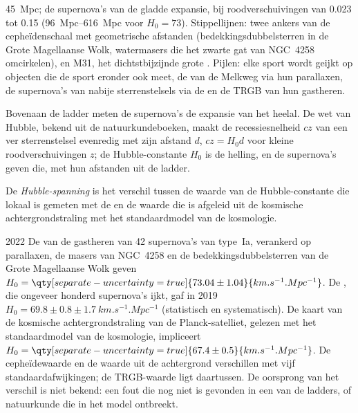 \begin{omfigure}
{\qty{45}{Mpc}; de supernova's van de gladde expansie, bij roodverschuivingen van 0.023
tot 0.15 (\qtyrange{96}{616}{Mpc} voor $H_0 = 73$). Stippellijnen: twee ankers van
de cepheïdenschaal met geometrische afstanden (bedekkingsdubbelsterren in de
Grote Magellaanse Wolk, watermasers die het zwarte gat van NGC~4258 omcirkelen), en M31, het
dichtstbijzijnde grote . Pijlen: elke sport wordt geijkt op objecten die de
sport eronder ook meet, de  van de Melkweg via hun parallaxen,
de supernova's van nabije sterrenstelsels via de  en de TRGB van hun
gastheren.}\label{fig:b3:milky-way-galaxies:ladder-rungs}
\end{omfigure}

Bovenaan de ladder meten de supernova's de expansie van het
heelal. De wet van Hubble, bekend uit de natuurkundeboeken, maakt de
recessiesnelheid $cz$ van een ver sterrenstelsel evenredig met zijn afstand $d$,
$cz = H_0 d$ voor kleine roodverschuivingen $z$; de Hubble-constante $H_0$ is de
helling, en de supernova's geven die, met hun afstanden uit de ladder.

\begin{definition}\label{def:b3:milky-way-galaxies:tension}
De \emph{Hubble-spanning} is het verschil tussen de
waarde van de Hubble-constante die lokaal is gemeten met de
 en de waarde die is afgeleid uit de kosmische
achtergrondstraling met het standaardmodel van de kosmologie.
\end{definition}

\begin{dated}{2022}
De  van de gastheren van 42 supernova's van type~Ia, verankerd op
parallaxen, de masers van NGC~4258 en de bedekkingsdubbelsterren van de
Grote Magellaanse Wolk geven
$H_0 = \qty[separate-uncertainty=true]{73.04 \pm 1.04}{km.s^{-1}.Mpc^{-1}}$.
De , die ongeveer honderd supernova's ijkt,
gaf in 2019 $H_0 = 69.8 \pm 0.8 \pm \qty{1.7}{km.s^{-1}.Mpc^{-1}}$
(statistisch en systematisch). De kaart van de kosmische
achtergrondstraling van de Planck-satelliet, gelezen met het standaardmodel van de kosmologie, impliceert
$H_0 = \qty[separate-uncertainty=true]{67.4 \pm 0.5}{km.s^{-1}.Mpc^{-1}}$.
De cepheïdewaarde en de waarde uit de achtergrond verschillen met vijf standaardafwijkingen;
de TRGB-waarde ligt daartussen. De oorsprong van het
verschil is niet bekend: een fout die nog niet is gevonden in een van de ladders,
of natuurkunde die in het model ontbreekt.
\end{dated}

